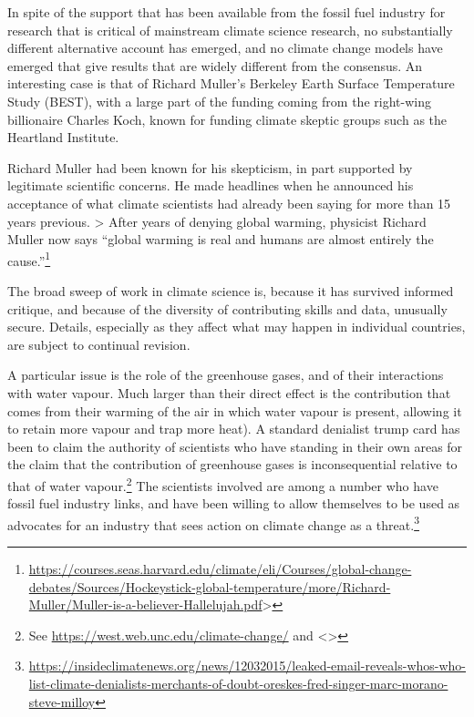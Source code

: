 \documentclass[
  10pt,
  b5paper]{book}
\begin{document}
In spite of the support that has been available from the fossil fuel
industry for research that is critical of mainstream climate science
research, no substantially different alternative account has emerged,
and no climate change models have emerged that give results that are
widely different from the consensus. An interesting case is that of
Richard Muller's Berkeley Earth Surface Temperature Study (BEST),
with a large part of the funding coming from the right-wing billionaire
Charles Koch, known for funding climate skeptic groups such as the
Heartland Institute.

Richard Muller had been known for his skepticism, in part supported
by legitimate scientific concerns. He made headlines when he announced
his acceptance of what climate scientists had already been saying
for more than 15 years previous.
\textgreater{} After years of denying global warming, physicist Richard Muller now says ``global warming is real and humans are almost entirely the cause.''\footnote{\url{https://courses.seas.harvard.edu/climate/eli/Courses/global-change-debates/Sources/Hockeystick-global-temperature/more/Richard-Muller/Muller-is-a-believer-Hallelujah.pdf}\textgreater{}}

The broad sweep of work in climate science is, because it has survived
informed critique, and because of the diversity of contributing skills
and data, unusually secure. Details, especially as they affect what may
happen in individual countries, are subject to continual revision.

A particular issue is the role of the greenhouse gases, and of their
interactions with water vapour. Much larger than their direct effect
is the contribution that comes from their warming of the air in which
water vapour is present, allowing it to retain more vapour and trap
more heat). A standard denialist trump card has been to claim the
authority of scientists who have standing in their own areas for the
claim that the contribution of greenhouse gases is inconsequential
relative to that of water
vapour.\footnote{See \url{https://west.web.unc.edu/climate-change/} and
  \textless\textgreater{}}
The scientists involved are among a number who have fossil fuel
industry links, and have been willing to allow themselves to be
used as advocates for an industry that sees action on climate
change as a threat.\footnote{\url{https://insideclimatenews.org/news/12032015/leaked-email-reveals-whos-who-list-climate-denialists-merchants-of-doubt-oreskes-fred-singer-marc-morano-steve-milloy}}
\end{document}

